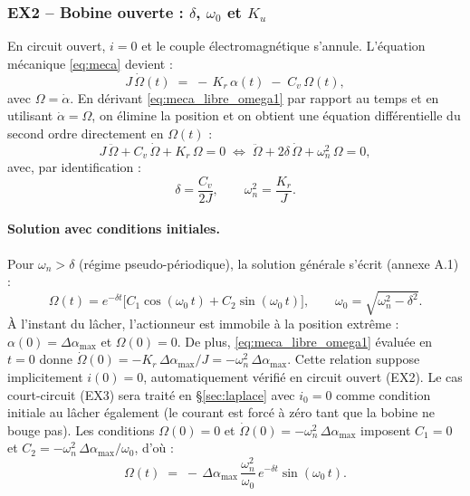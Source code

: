\subsubsection{EX2 -- Bobine ouverte : \texorpdfstring{\(\delta\)}{d}, \texorpdfstring{\(\omega_0\)}{w0} et \texorpdfstring{\(K_u\)}{Ku}}

En circuit ouvert, \(i = 0\) et le couple électromagnétique s'annule. L'équation mécanique \eqref{eq:meca} devient :
\begin{equation}
J\,\dot\Omega(t) \;=\; -\,K_r\,\alpha(t) \;-\; C_v\,\Omega(t),
\label{eq:meca_libre_omega1}
\end{equation}
avec \(\Omega = \dot\alpha\). En dérivant \eqref{eq:meca_libre_omega1} par rapport au temps et en utilisant \(\dot\alpha = \Omega\), on élimine la position et on obtient une équation différentielle du second ordre directement en \(\Omega(t)\) :
\begin{equation}
J\,\ddot\Omega + C_v\,\dot\Omega + K_r\,\Omega = 0
\;\Longleftrightarrow\;
\ddot\Omega + 2\delta\,\dot\Omega + \omega_n^2\,\Omega = 0,
\label{eq:meca_libre}
\end{equation}
avec, par identification :
\begin{equation}
\delta = \frac{C_v}{2J}, \qquad \omega_n^2 = \frac{K_r}{J}.
\end{equation}

\paragraph{Solution avec conditions initiales.}
Pour \(\omega_n > \delta\) (régime pseudo-périodique), la solution générale s'écrit (annexe A.1) :
\begin{equation}
\Omega(t) = e^{-\delta t}\bigl[C_1\cos(\omega_0\,t) + C_2\sin(\omega_0\,t)\bigr], \qquad \omega_0 = \sqrt{\omega_n^2 - \delta^2}.
\end{equation}
À l'instant du lâcher, l'actionneur est immobile à la position extrême : \(\alpha(0) = \Delta\alpha_{\max}\) et \(\Omega(0) = 0\). De plus, \eqref{eq:meca_libre_omega1} évaluée en \(t=0\) donne \(\dot\Omega(0) = -K_r\,\Delta\alpha_{\max}/J = -\omega_n^2\,\Delta\alpha_{\max}\). Cette relation suppose implicitement \(i(0) = 0\), automatiquement vérifié en circuit ouvert (EX2). Le cas court-circuit (EX3) sera traité en §\ref{sec:laplace} avec \(i_0 = 0\) comme condition initiale au lâcher également (le courant est forcé à zéro tant que la bobine ne bouge pas). Les conditions \(\Omega(0)=0\) et \(\dot\Omega(0) = -\omega_n^2\,\Delta\alpha_{\max}\) imposent \(C_1 = 0\) et \(C_2 = -\omega_n^2\,\Delta\alpha_{\max}/\omega_0\), d'où :
\begin{equation}
\Omega(t) \;=\; -\,\Delta\alpha_{\max}\,\frac{\omega_n^2}{\omega_0}\,e^{-\delta t}\sin(\omega_0\,t).
\label{eq:alpha_t}
\end{equation}

